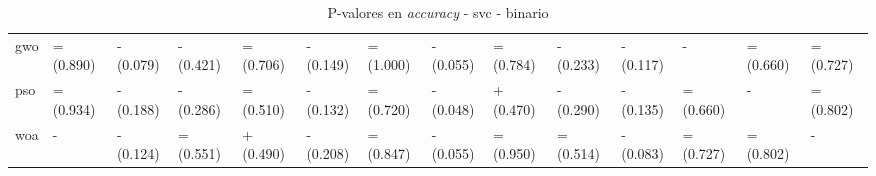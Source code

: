 \begin{table}
\begin{adjustbox}{width=\linewidth}
\begin{tabular}{llllllllllllll}
            gwo   & = (0.890) & - (0.079) & - (0.421) & = (0.706) & - (0.149) & = (1.000) & - (0.055) & = (0.784) & - (0.233) & - (0.117) & -         & = (0.660) & = (0.727) \\
            pso   & = (0.934) & - (0.188) & - (0.286) & = (0.510) & - (0.132) & = (0.720) & - (0.048) & + (0.470) & - (0.290) & - (0.135) & = (0.660) & -         & = (0.802) \\
            woa   & -         & - (0.124) & = (0.551) & + (0.490) & - (0.208) & = (0.847) & - (0.055) & = (0.950) & = (0.514) & - (0.083) & = (0.727) & = (0.802) & -         \\
            \bottomrule
        \end{tabular}
    \end{adjustbox}
    \caption{P-valores en \textit{accuracy} - svc - binario}
    \label{tab:p-values_accuracy_bin_svc}
\end{table}

